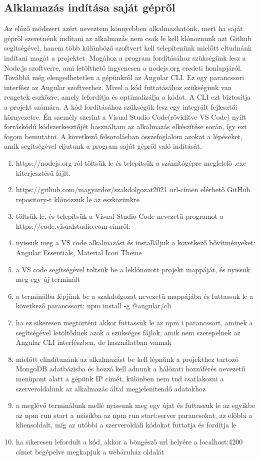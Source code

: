 \subsection{Alklamazás indítása saját gépről}
Az előző  módszert azért neveztem könnyebben alkalmazhatónk, mert ha saját gépről szeretnénk indítani az alkalmazás nem csak le kell klónoznunk azt Github segítségével, hanem több különböző szoftvert kell telepítenünk mielőtt eltudnánk indítani magát a projektet. Magához a program fordításához szükségünk lesz a Node.js szoftverre, ami letölthető ingyenesen a nodejs.org eredeti honlapjáról. Továbbá még elengedhetetlen a gépünkről az Angular CLI. Ez egy parancssori interfész az Angular szoftverhez. Mivel a kód futtatásához szükségünk van rengetek eszközre, amely lefordítja és optimalizálja a kódot. A CLI ezt biztosítja a projekt számára. A kód fordításához szükségük lesz egy integrált fejlesztői környezetre. Én személy szerint a Visual Studio Code(rövidítve VS Code) nyílt forráskódú kódszerkesztőjét használtam az alkalmazás elkészítése során, így ezt fogom bemutatni. A következő felsorolásban összefoglalom azokat a lépéseket, amik segítségével eljutunk a program saját gépről való indítását. 

\begin{enumerate}
	\item\label{step:first} https://nodejs.org-ról töltsük le és telepítsük a számítógépre megfelelő .exe kiterjesztésű fájlt.
	\item https://github.com/magyardor/szakdolgozat2021 url-címen elérhető GitHub repository-t klónozzuk le az eszközünkre
	\item töltsük le, és telepítsük a Visual Studio Code nevezetű programot a https://code.visualstudio.com címről.
	\item nyissuk meg a VS code alkalmazást és installáljuk a következő bővítményeket: Angular Essentials, Material Icon Theme
	\item a VS code segítségével töltsük be a leklónozott projekt mappáját, és nyissuk meg egy új terminált
	\item a terminálba lépjünk be a szakdolgozat nevezetű mappájába és futtassuk le a következő parancssort: npm install -g @angular/cli
	\item ha ez sikeresen megtörtént akkor futtassuk le az npm i parancssort, aminek a segítségével letöltődnek azok a szükséges fájlok, amik nem szerepelnek az Angular CLI interfészben, de használatban vannak 
	\item mielőtt elindítanánk az alkalmazást be kell lépnünk a projekthez tartozó MongoDB adatbázisba és hozzá kell adnunk a hálózati hozzáférés nevezetű menüpont alatt a gépünk IP címét, különben nem tud csatlakozni a szerveroldalunk az alkalmazás által megjelenítendő adatokhoz
	\item a meglévő terminálunk mellé nyissunk meg egy újat és futtassuk le az egyikbe az npm run start a másikba az npm run start:server parancsokat, az előbbi a kliensoldalt, míg az utóbbi a szerveroldali kódokat futtatja és fordítja le
	\item ha sikeresen lefordult a kód, akkor a böngésző url helyére a localhost:4200 címet begépelve megkapjuk a webáruház oldalát
\end{enumerate}


